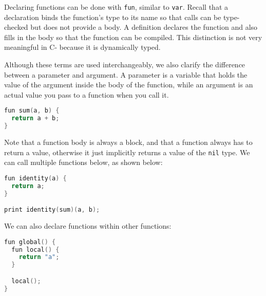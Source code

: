Declaring functions can be done with \verb+fun+, similar to \verb+var+. Recall that a declaration binds the function’s type to its name so that calls can be type-checked but does not provide a body. A definition declares the function and also fills in the body so that the function can be compiled. This distinction is not very meaningful in C- because it is dynamically typed. 

Although these terms are used interchangeably, we also clarify the difference between a parameter and argument. A parameter is a variable that holds the value of the argument inside the body of the function, while an argument is an actual value you pass to a function when you call it.

\begin{lstlisting}[language=C]
fun sum(a, b) {
  return a + b;
}
\end{lstlisting}

Note that a function body is always a block, and that a function always has to return a value, otherwise it just implicitly returns a value of the \verb+nil+ type. We can call multiple functions below, as shown below:

\begin{lstlisting}[language=C]
fun identity(a) {
  return a;
}

print identity(sum)(a, b);
\end{lstlisting}

We can also declare functions within other functions:


\begin{lstlisting}[language=C]
fun global() {
  fun local() {
    return "a";
  }

  local();
}
\end{lstlisting}


